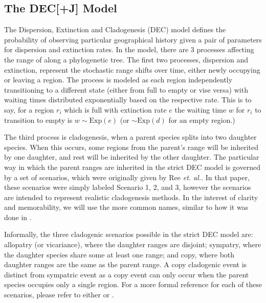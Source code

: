 \documentclass{article}
\begin{document}
\subsection{The DEC[+J] Model} \label{sec:model}

The Dispersion, Extinction and Cladogenesis (DEC) model defines the probability
of observing particular geographical history given a pair of parameters for
dispersion and extinction rates.
In the model, there are 3 processes affecting the range of along a phylogenetic
tree.
The first two processes, dispersion and extinction, represent the stochastic
range shifts over time, either newly occupying or leaving a region.
The process is modeled as each region independently transitioning to a
different state (either from full to empty or vise versa) with waiting times
distributed exponentially based on the respective rate.
This is to say, for a region \( r_i \) which is full with extinction
rate \( e \) the waiting time \( w \) for \( r_i \) to transition to empty is \(
w \sim \text{Exp}(e) \) (or $\sim \text{Exp}(d)$ for an empty region.)

The third process is cladogenesis, when a parent species splits into two
daughter species.
When this occurs, some regions from the parent's range will be inherited by one
daughter, and rest will be inherited by the other daughter.
The particular way in which the parent ranges are inherited in the strict DEC
model is governed by a set of scenarios, which were originally given by 
Ree \textit{et. al.}\citep{ALikelihoodFrReeR2005}.
In that paper, these scenarios were simply labeled Scenario 1, 2, and 3, however
the scenarios are intended to represent realistic cladogenesis methods.
In the interest of clarity and memorability, we will use the more common names,
similar to how it was done in \citet{ModelSelectionMatzke2014}.

Informally, the three cladogenic scenarios possible in the strict DEC model are:
allopatry (or vicariance), where the daughter ranges are disjoint; sympatry,
where the daughter species share some at least one range; and copy, where both
daughter ranges are the same as the parent range.
A copy cladogenic event is distinct from sympatric event as a copy event can
only occur when the parent species occupies only a single region.
For a more formal reference for each of these scenarios, please refer to either
\citet{ALikelihoodFrReeR2005} or \citet{ModelSelectionMatzke2014}.
\end{document}

